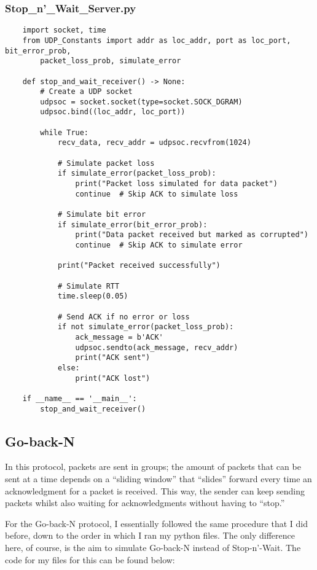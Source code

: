 \documentclass{article}
\begin{document}
\subsubsection{Stop\_n'\_Wait\_Server.py}

\begin{verbatim}
    import socket, time
    from UDP_Constants import addr as loc_addr, port as loc_port, bit_error_prob,
        packet_loss_prob, simulate_error

    def stop_and_wait_receiver() -> None:
        # Create a UDP socket
        udpsoc = socket.socket(type=socket.SOCK_DGRAM)
        udpsoc.bind((loc_addr, loc_port))

        while True:
            recv_data, recv_addr = udpsoc.recvfrom(1024)
        
            # Simulate packet loss
            if simulate_error(packet_loss_prob):
                print("Packet loss simulated for data packet")
                continue  # Skip ACK to simulate loss
        
            # Simulate bit error
            if simulate_error(bit_error_prob):
                print("Data packet received but marked as corrupted")
                continue  # Skip ACK to simulate error
        
            print("Packet received successfully")

            # Simulate RTT
            time.sleep(0.05)

            # Send ACK if no error or loss
            if not simulate_error(packet_loss_prob):
                ack_message = b'ACK'
                udpsoc.sendto(ack_message, recv_addr)
                print("ACK sent")
            else:
                print("ACK lost")

    if __name__ == '__main__':
        stop_and_wait_receiver()
\end{verbatim}

\subsection{Go-back-N}

In this protocol, packets are sent in groups; the amount of packets that can be sent at a time depends on a ``sliding window'' that ``slides'' forward every time an acknowledgment for a packet is received. This way, the sender can keep sending packets whilst also waiting for acknowledgments without having to ``stop.''

For the Go-back-N protocol, I essentially followed the same procedure that I did before, down to the order in which I ran my python files. The only difference here, of course, is the aim to simulate Go-back-N instead of Stop-n'-Wait. The code for my files for this can be found below:
\end{document}
